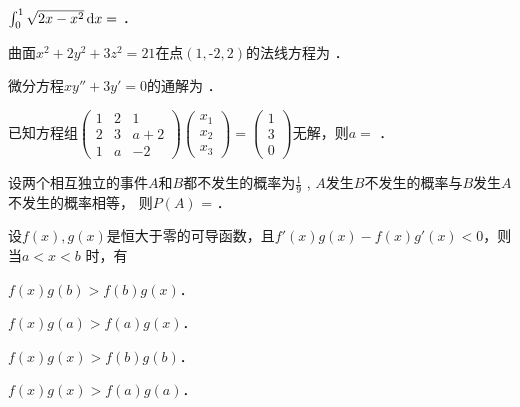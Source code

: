 \documentclass[plain,noanswer,medmath]{../../template/jnuexam}
\begin{document}




\begin{problem}
$\int_0^1 \sqrt{2x - x^2} \mathop{}\!\mathrm{d} x =$ \fillin{}．
\end{problem}


\begin{problem}
曲面$x^2 + 2y^2 + 3z^2 = 21$在点$\left(1,\text{-}2,2 \right)$的法线方程为 \fillin{}．
\end{problem}


\begin{problem}
微分方程$xy'' + 3y' = 0$的通解为 \fillin{}．
\end{problem}


\begin{problem}
已知方程组$\begin{pmatrix}
  1 & 2 & 1 \\
  2 & 3 & a + 2 \\
  1 & a & -2
\end{pmatrix}\begin{pmatrix}
  x_1 \\
  x_2 \\
  x_3
\end{pmatrix} = \begin{pmatrix}
  1 \\
  3 \\
  0
\end{pmatrix}$无解，则$a =$ \fillin{}．
\end{problem}


\begin{problem}
设两个相互独立的事件$A$和$B$都不发生的概率为$\frac{1}{9}$ , $A$发生$B$不发生的概率与$B$发生$A$不发生的概率相等，
则$P(A)$ = \fillin{}．
\end{problem}




\begin{problem}
设$f(x),g(x)$是恒大于零的可导函数，且$f'(x)g(x) - f(x)g'(x) < 0$，则当$a < x < b$ 时，有\pickout{}
\begin{abcd}
\item $f(x)g(b) > f(b)g(x)$．
\item $f(x)g(a) > f(a)g(x)$．
\item $f(x)g(x) > f(b)g(b)$．
\item $f(x)g(x) > f(a)g(a)$．
\end{abcd}
\end{problem}
\end{document}
